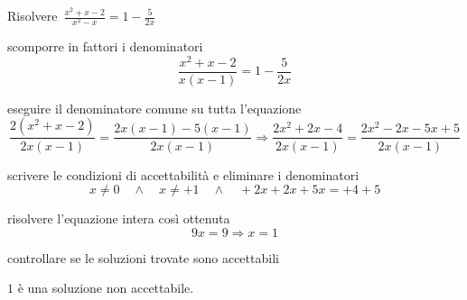  \begin{esempio}
Risolvere~$\frac{x^{2}+x-2}{x^{2}-x}=1-\frac{5}{2x}$

\begin{enumerate*}
\item scomporre in fattori i denominatori
\[\frac{x^{2}+x-2}{x(x-1)}=1-\frac{5}{2x}\]

\item eseguire il denominatore comune su tutta l'equazione
\[\frac{2(x^{2}+x-2)}{2x(x-1)}=\frac{2x(x-1)-5(x-1)}{2x(x-1)}\Rightarrow
\frac{2x^{2}+2x-4}{2x(x-1)}=\frac{2x^2-2x-5x+5}{2x(x-1)}\]

\item scrivere le condizioni di accettabilità e eliminare i denominatori
\[x \neq 0 \quad \wedge \quad x \neq +1 \quad \wedge \quad +2x +2x +5x = +4 +5\]

\item risolvere l'equazione intera così ottenuta
\[9x = 9 \Rightarrow x=1\]

\item controllare se le soluzioni trovate sono accettabili

\centering $1$ è una soluzione non accettabile.

\end{enumerate*}

 \end{esempio}
 
